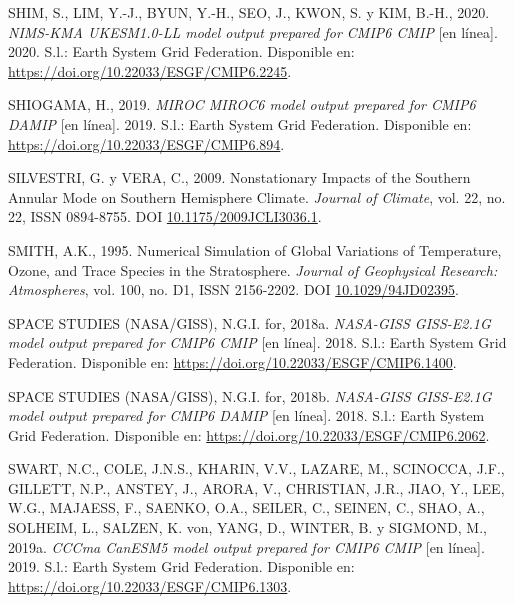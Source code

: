 \documentclass[12pt,oneside,a4paper]{reedthesis}
\newlength{\cslhangindent}
\newenvironment{CSLReferences}[2] %
 {%
  \setlength{\parindent}{0pt}
  \ifodd #1 \everypar{\setlength{\hangindent}{\cslhangindent}}\ignorespaces\fi
  \ifnum #2 > 0
  \setlength{\parskip}{#2\baselineskip}
  \fi
 }%
 {}
\begin{document}
\begin{CSLReferences}{1}{0}
\leavevmode{}%
SHIM, S., LIM, Y.-J., BYUN, Y.-H., SEO, J., KWON, S. y KIM, B.-H., 2020. \emph{NIMS-KMA UKESM1.0-LL model output prepared for CMIP6 CMIP} {[}en línea{]}. 2020. S.l.: Earth System Grid Federation. Disponible en: \url{https://doi.org/10.22033/ESGF/CMIP6.2245}.

\leavevmode{}%
SHIOGAMA, H., 2019. \emph{MIROC MIROC6 model output prepared for CMIP6 DAMIP} {[}en línea{]}. 2019. S.l.: Earth System Grid Federation. Disponible en: \url{https://doi.org/10.22033/ESGF/CMIP6.894}.

\leavevmode{}%
SILVESTRI, G. y VERA, C., 2009. Nonstationary {Impacts} of the {Southern Annular Mode} on {Southern Hemisphere Climate}. \emph{Journal of Climate}, vol. 22, no. 22, ISSN 0894-8755. DOI \href{https://doi.org/10.1175/2009JCLI3036.1}{10.1175/2009JCLI3036.1}.

\leavevmode{}%
SMITH, A.K., 1995. Numerical Simulation of Global Variations of Temperature, Ozone, and Trace Species in the Stratosphere. \emph{Journal of Geophysical Research: Atmospheres}, vol. 100, no. D1, ISSN 2156-2202. DOI \href{https://doi.org/10.1029/94JD02395}{10.1029/94JD02395}.

\leavevmode{}%
SPACE STUDIES (NASA/GISS), N.G.I. for, 2018a. \emph{NASA-GISS GISS-E2.1G model output prepared for CMIP6 CMIP} {[}en línea{]}. 2018. S.l.: Earth System Grid Federation. Disponible en: \url{https://doi.org/10.22033/ESGF/CMIP6.1400}.

\leavevmode{}%
SPACE STUDIES (NASA/GISS), N.G.I. for, 2018b. \emph{NASA-GISS GISS-E2.1G model output prepared for CMIP6 DAMIP} {[}en línea{]}. 2018. S.l.: Earth System Grid Federation. Disponible en: \url{https://doi.org/10.22033/ESGF/CMIP6.2062}.

\leavevmode{}%
SWART, N.C., COLE, J.N.S., KHARIN, V.V., LAZARE, M., SCINOCCA, J.F., GILLETT, N.P., ANSTEY, J., ARORA, V., CHRISTIAN, J.R., JIAO, Y., LEE, W.G., MAJAESS, F., SAENKO, O.A., SEILER, C., SEINEN, C., SHAO, A., SOLHEIM, L., SALZEN, K. von, YANG, D., WINTER, B. y SIGMOND, M., 2019a. \emph{CCCma CanESM5 model output prepared for CMIP6 CMIP} {[}en línea{]}. 2019. S.l.: Earth System Grid Federation. Disponible en: \url{https://doi.org/10.22033/ESGF/CMIP6.1303}.


\end{CSLReferences}
\end{document}
